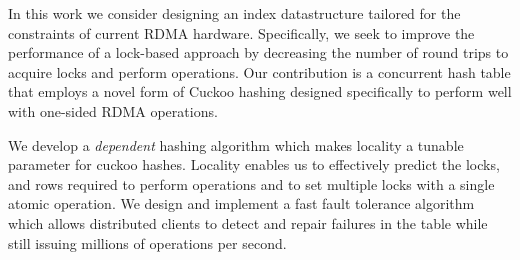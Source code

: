 
In this work we consider designing an index datastructure
tailored for the constraints of current RDMA hardware.
Specifically, we seek to improve the performance of a
lock-based approach by decreasing the number of round trips
to acquire locks and perform operations. Our contribution is
a concurrent hash table that employs a novel form of Cuckoo
hashing designed specifically to perform well with one-sided
RDMA operations.

We develop a
\emph{dependent} hashing algorithm which makes locality a
tunable parameter for cuckoo hashes.  Locality enables us to
effectively predict the locks, and rows required to perform
operations and to set multiple locks with a single atomic
operation. We design and implement a fast fault tolerance
algorithm which allows distributed clients to detect and
repair failures in the table while still issuing millions of
operations per second.




